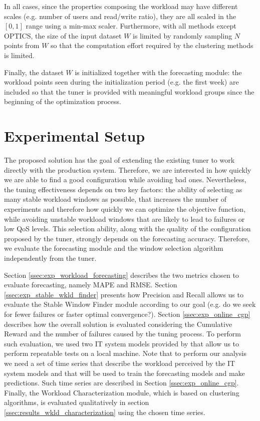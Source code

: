 \documentclass[a4paper, 12pt]{article} %
\begin{document}
	In all cases, since the properties composing the workload may have different scales (e.g. number of users and read/write ratio), they are all scaled in the $[0, 1]$ range using a min-max scaler.	Furthermore, with all methods except OPTICS, the size of the input dataset $W$ is limited by randomly sampling $N$ points from $W$ so that the computation effort required by the clustering methods is limited.	
	
	Finally, the dataset $W$ is initialized together with the forecasting module: the workload points seen during the initialization period (e.g. the first week) are included so that the tuner is provided with meaningful workload groups since the beginning of the optimization process.

	\section{Experimental Setup } \label{sec:exp_setup}
	The proposed solution has the goal of extending the existing tuner \cite{AkamasCGP} to work directly with the production system. Therefore, we are interested in how quickly we are able to find a good configuration while avoiding bad ones. Nevertheless, the tuning effectiveness depends on two key factors: the ability of selecting as many stable workload windows as possible, that increases the number of experiments and therefore how quickly we can optimize the objective function, while avoiding unstable workload windows that are likely to lead to failures or low QoS levels. This selection ability,  along with the quality of the configuration proposed by the tuner, strongly depends on the forecasting accuracy.
	Therefore, we evaluate the forecasting module and the window selection algorithm independently from the tuner.
	
	Section \ref{ssec:exp_workload_forecasting} describes the two metrics chosen to evaluate forecasting, namely MAPE and RMSE. Section \ref{ssec:exp_stable_wkld_finder} presents how Precision and Recall allows us to evaluate the Stable Window Finder module according to our goal (e.g. do we seek for fewer failures or faster optimal convergence?). Section \ref{ssec:exp_online_cgp} describes how the overall solution is evaluated considering the Cumulative Reward and the number of failures caused by the tuning process. To perform such evaluation, we used two IT system models provided by \cite{AkamasCGP} that allow us to perform repeatable tests on a local machine. 
	Note that to perform our analysis we need a set of time series that describe the workload perceived by the IT system models and that will be used to train the forecasting models and make predictions. Such time series are described in Section \ref{ssec:exp_online_cgp}.
	Finally, the Workload Characterization module, which is based on clustering algorithms, is evaluated qualitatively in section \ref{ssec:results_wkld_characterization} using the chosen time series. 
	
\end{document}
